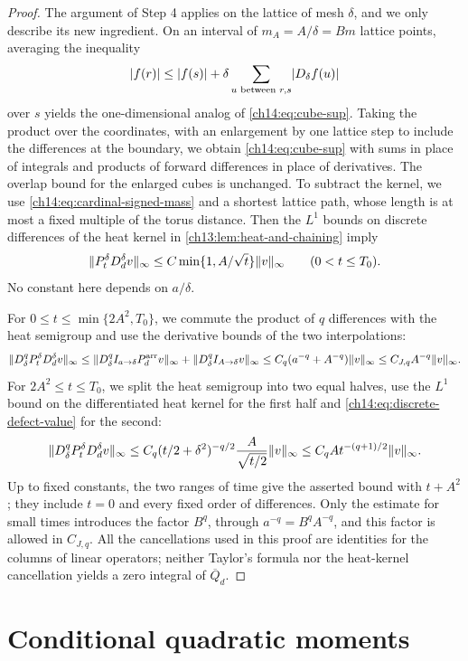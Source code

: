 \begin{proof}
The argument of Step 4 applies on the lattice of mesh $\delta$, and we only describe its new ingredient. On an interval of $m_A=A/\delta=Bm$ lattice points, averaging the inequality
\[
 \lvert f(r)\rvert\le\lvert f(s)\rvert+\delta\sum_{u\text{ between }r,s}\lvert D_\delta f(u)\rvert
\]
over $s$ yields the one-dimensional analog of \eqref{ch14:eq:cube-sup}. Taking the product over the coordinates, with an enlargement by one lattice step to include the differences at the boundary, we obtain \eqref{ch14:eq:cube-sup} with sums in place of integrals and products of forward differences in place of derivatives. The overlap bound for the enlarged cubes is unchanged. To subtract the kernel, we use \eqref{ch14:eq:cardinal-signed-mass} and a shortest lattice path, whose length is at most a fixed multiple of the torus distance. Then the $L^1$ bounds on discrete differences of the heat kernel in \cref{ch13:lem:heat-and-chaining} imply
\begin{equation}\label{ch14:eq:discrete-defect-value}
 \lVert P_t^\delta D_d^\delta v\rVert_\infty\le C\min\{1,A/\sqrt t\}\lVert v\rVert_\infty\qquad(0<t\le T_0).
\end{equation}
No constant here depends on $a/\delta$.

For $0\le t\le\min\{2A^2,T_0\}$, we commute the product of $q$ differences with the heat semigroup and use the derivative bounds of the two interpolations:
\[
 \lVert D_\delta^qP_t^\delta D_d^\delta v\rVert_\infty
 \le\lVert D_\delta^qI_{a\to\delta}P_d^{\mathrm{arr}}v\rVert_\infty+\lVert D_\delta^qI_{A\to\delta}v\rVert_\infty
 \le C_q(a^{-q}+A^{-q})\lVert v\rVert_\infty\le C_{J,q}A^{-q}\lVert v\rVert_\infty.
\]
For $2A^2\le t\le T_0$, we split the heat semigroup into two equal halves, use the $L^1$ bound on the differentiated heat kernel for the first half and \eqref{ch14:eq:discrete-defect-value} for the second:
\[
 \lVert D_\delta^qP_t^\delta D_d^\delta v\rVert_\infty\le C_q(t/2+\delta^2)^{-q/2}\frac A{\sqrt{t/2}}\lVert v\rVert_\infty\le C_qAt^{-(q+1)/2}\lVert v\rVert_\infty.
\]
Up to fixed constants, the two ranges of time give the asserted bound with $t+A^2$; they include $t=0$ and every fixed order of differences. Only the estimate for small times introduces the factor $B^q$, through $a^{-q}=B^qA^{-q}$, and this factor is allowed in $C_{J,q}$. All the cancellations used in this proof are identities for the columns of linear operators; neither Taylor's formula nor the heat-kernel cancellation yields a zero integral of $\overline Q_d$.
\end{proof}

\section{Conditional quadratic moments}\label{ch14:sec:quadratic}

